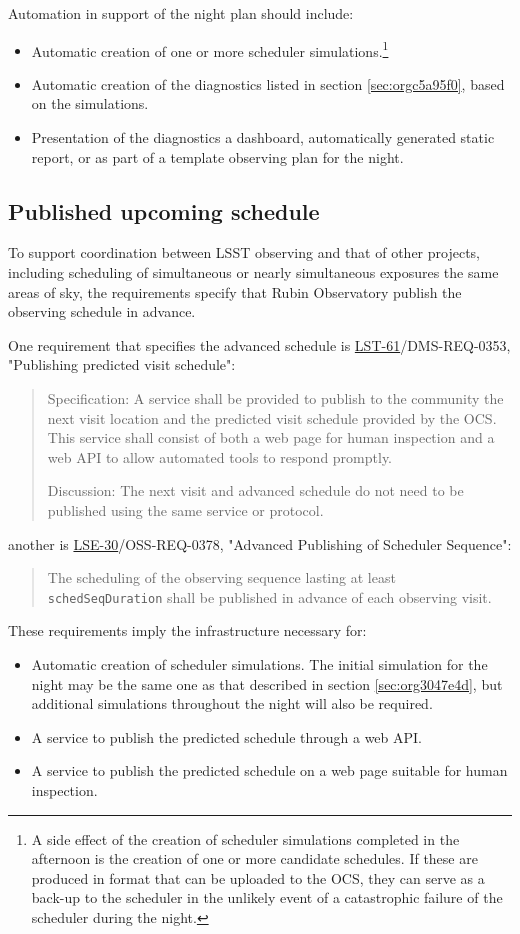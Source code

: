 Automation in support of the night plan should include:
\begin{itemize}
\item Automatic creation of one or more scheduler simulations.\footnote{A side effect of the creation of scheduler simulations completed in the afternoon is the creation of one or more candidate schedules. If these are produced in format that can be uploaded to the OCS, they can serve as a back-up to the scheduler in the unlikely event of a catastrophic failure of the scheduler during the night.}
\item Automatic creation of the diagnostics listed in section \ref{sec:orgc5a95f0}, based on the simulations.
\item Presentation of the diagnostics a dashboard, automatically generated static report, or as part of a template observing plan for the night.
\end{itemize}

\subsection{Published upcoming schedule}
\label{sec:orgcc6940d}
To support coordination between LSST observing and that of other projects, including scheduling of simultaneous or nearly simultaneous exposures the same areas of sky, the requirements specify that Rubin Observatory publish the observing schedule in advance.

One requirement that specifies the advanced schedule is \href{https://ls.st/lse-61}{LST-61}/DMS-REQ-0353, "Publishing predicted visit schedule":
\begin{quote}
Specification: A service shall be provided to publish to the community the next visit location and the predicted visit schedule provided by the OCS. This service shall consist of both a web page for human inspection and a web API to allow automated tools to respond promptly.

Discussion: The next visit and advanced schedule do not need to be published using the same service or protocol.
\end{quote}
another is \href{https://ls.st/lse-30}{LSE-30}/OSS-REQ-0378, "Advanced Publishing of Scheduler Sequence":
\begin{quote}
The scheduling of the observing sequence lasting at least \texttt{schedSeqDuration} shall be published in advance of each observing visit.
\end{quote}

These requirements imply the infrastructure necessary for:
\begin{itemize}
\item Automatic creation of scheduler simulations. The initial simulation for the night may be the same one as that described in section \ref{sec:org3047e4d}, but additional simulations throughout the night will also be required.
\item A service to publish the predicted schedule through a web API.
\item A service to publish the predicted schedule on a web page suitable for human inspection.
\end{itemize}

